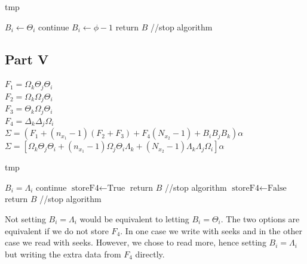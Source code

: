 \documentclass[conference]{IEEEtran}
\begin{document}
  \begin{algorithm}[h]
    \caption{tmp}
    \begin{algorithmic}[1]
      \STATE $B_i \leftarrow \Theta_i$
      \STATE continue
    \ELSE
      \STATE $B_i \leftarrow \phi - 1$
      \STATE return $B$ //stop algorithm
    \ENDIF
    \end{algorithmic}
  \end{algorithm}

  \subsection{Part V}
  \noindent $F_1 = \Omega_k \Theta_j \Theta_i$ \\
  $F_2 = \Omega_k \Omega_j \Theta_i$ \\
  $F_3 = \Theta_k \Omega_j \Theta_i$ \\
  $F_4 = \Delta_k \Delta_j \Omega_i$ \\

  \noindent $\Sigma = (F_1 + (n_{x_1}-1)(F_2 + F_3) + F_4(N_{x_2}-1) + B_iB_jB_k)\alpha$ \\
  $\Sigma = [\Omega_k\Theta_j\Theta_i + (n_{x_1}-1)\Omega_j\Theta_i\Lambda_k + (N_{x_2}-1)\Lambda_k\Lambda_j\Omega_i]\alpha$

  \begin{algorithm}[h]
    \caption{tmp}
    \begin{algorithmic}[1]
    \STATE $B_i = \Lambda_i$
      \STATE continue
      \STATE $\textrm{storeF4} \leftarrow \textrm{True}$
      \STATE return $B$ //stop algorithm
    \ELSE
      \STATE $\textrm{storeF4} \leftarrow \textrm{False}$
      \STATE return $B$ //stop algorithm
    \ENDIF
    \end{algorithmic}
  \end{algorithm}

  Not setting $B_i = \Lambda_i$ would be equivalent to letting $B_i = \Theta_i$.
  The two options are equivalent if we do not store $F_4$.
  In one case we write with seeks and in the other case we read with seeks.
  However, we chose to read more, hence setting $B_i = \Lambda_i$ but writing the extra data from $F_4$ directly.
\end{document}
